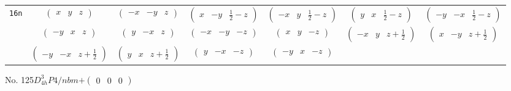 \documentclass[fleqn,9pt,landscape]{jsarticle}
\begin{document}
\begin{center}
\begin{longtable}{ccccccc}
{\tt 16n} & $ \begin{pmatrix} x & y & z \end{pmatrix} $ & $ \begin{pmatrix} - x & - y & z \end{pmatrix} $ & $ \begin{pmatrix} x & - y & \frac{1}{2} - z \end{pmatrix} $ & $ \begin{pmatrix} - x & y & \frac{1}{2} - z \end{pmatrix} $ & $ \begin{pmatrix} y & x & \frac{1}{2} - z \end{pmatrix} $ & $ \begin{pmatrix} - y & - x & \frac{1}{2} - z \end{pmatrix} $ \\
& $ \begin{pmatrix} - y & x & z \end{pmatrix} $ & $ \begin{pmatrix} y & - x & z \end{pmatrix} $ & $ \begin{pmatrix} - x & - y & - z \end{pmatrix} $ & $ \begin{pmatrix} x & y & - z \end{pmatrix} $ & $ \begin{pmatrix} - x & y & z + \frac{1}{2} \end{pmatrix} $ & $ \begin{pmatrix} x & - y & z + \frac{1}{2} \end{pmatrix} $ \\
& $ \begin{pmatrix} - y & - x & z + \frac{1}{2} \end{pmatrix} $ & $ \begin{pmatrix} y & x & z + \frac{1}{2} \end{pmatrix} $ & $ \begin{pmatrix} y & - x & - z \end{pmatrix} $ & $ \begin{pmatrix} - y & x & - z \end{pmatrix} $ & $  $ & $  $ \\
\end{longtable}
\end{center}
\newpage
No. 125\quad$D_{4h}^{3}$\quad$P4/nbm$\quad[ tetragonal ]\quad$+\begin{pmatrix} 0 & 0 & 0 \end{pmatrix}$
\end{document}
